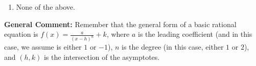 \documentclass{extbook}[14pt]
\begin{document}
\begin{enumerate}
{\begin{enumerate}[label=\Alph*.]
\begin{multicols}{2}
\end{multicols}\item None of the above.\end{enumerate}
\textbf{General Comment:} Remember that the general form of a basic rational equation is $ f(x) = \frac{a}{(x-h)^n} + k$, where $a$ is the leading coefficient (and in this case, we assume is either $1$ or $-1$), $n$ is the degree (in this case, either $1$ or $2$), and $(h, k)$ is the intersection of the asymptotes.
}
\end{enumerate}
\end{document}

